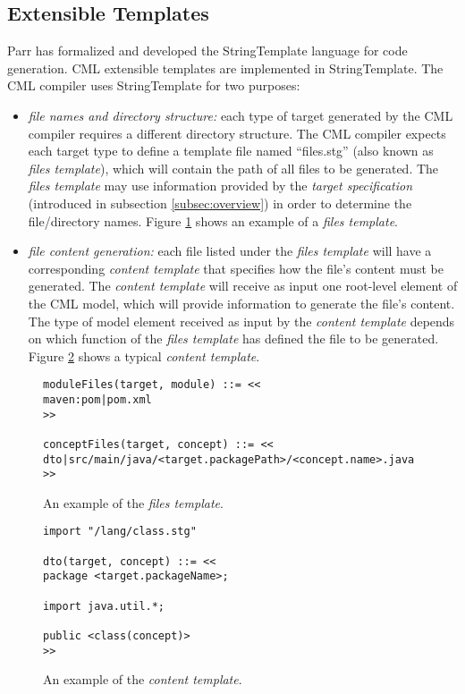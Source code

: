 \subsection{Extensible Templates}\label{subsec:templates}

Parr has formalized and developed the StringTemplate \cite{st} language for code generation. CML extensible templates are implemented in StringTemplate. The CML compiler uses StringTemplate for two purposes:

\begin{itemize}
\item \emph{file names and directory structure:}
each type of target generated by the CML compiler requires a different directory structure.
The CML compiler expects each target type to define a template file named ``files.stg'' (also known as \emph{files template}),
which will contain the path of all files to be generated. The \emph{files template} may use information provided by the \emph{target specification} (introduced in subsection \ref{subsec:overview}) in order to determine the file/directory names. Figure \ref{fig:template1} shows an example of a \emph{files template}.
\item \emph{file content generation:}
each file listed under the \emph{files template} will have a corresponding \emph{content template} that specifies how the file's content must be generated. The \emph{content template} will receive as input one root-level element of the CML model, which will provide information to generate the file's content. The type of model element received as input by the \emph{content template} depends on which function of the \emph{files template} has defined the file to be generated. Figure \ref{fig:template2} shows a typical \emph{content template}. 
\end{itemize}

\begin{figure}
\verbatimfont{\scriptsize}
\begin{verbatim}
moduleFiles(target, module) ::= <<
maven:pom|pom.xml
>>

conceptFiles(target, concept) ::= <<
dto|src/main/java/<target.packagePath>/<concept.name>.java
>>
\end{verbatim}
\caption{An example of the \emph{files template}.}
\label{fig:template1}
\end{figure}

\begin{figure}
\verbatimfont{\scriptsize}
\begin{verbatim}
import "/lang/class.stg"

dto(target, concept) ::= <<
package <target.packageName>;

import java.util.*;

public <class(concept)>
>>
\end{verbatim}
\caption{An example of the \emph{content template}.}
\label{fig:template2}
\end{figure}


